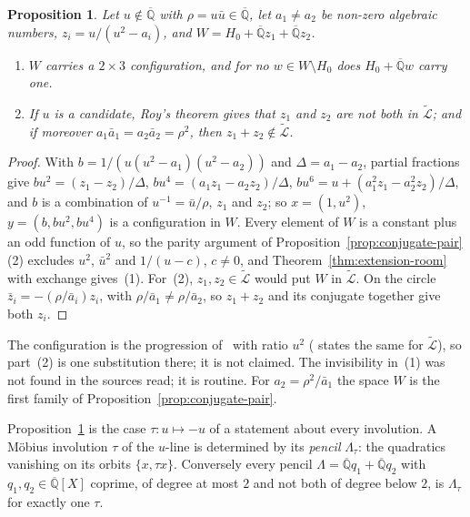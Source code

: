 \documentclass[11pt,a4paper]{article}
\theoremstyle{plain}
\newtheorem{proposition}[theorem]{Proposition}
\theoremstyle{definition}
\newcommand{\Alg}{\overline{\mathbb{Q}}}
\newcommand{\aLogs}{\widetilde{\mathcal{L}}}
\begin{document}
\begin{proposition}\label{prop:two-pole}
Let $u\notin\Alg$ with $\rho=u\bar u\in\Alg$, let $a_{1}\neq a_{2}$ be non-zero algebraic numbers, $z_{i}=u/(u^{2}-a_{i})$,
and $W=H_{0}+\Alg z_{1}+\Alg z_{2}$.
\begin{enumerate}[label=\textup{(\arabic*)}]
\item $W$ carries a $2\times3$ configuration, and for no $w\in W\setminus H_{0}$ does $H_{0}+\Alg w$ carry one.
\item If $u$ is a candidate, Roy's theorem gives that $z_{1}$ and $z_{2}$ are not both in $\aLogs$; and if moreover
$a_{1}\bar a_{1}=a_{2}\bar a_{2}=\rho^{2}$, then $z_{1}+z_{2}\notin\aLogs$.
\end{enumerate}
\end{proposition}

\begin{proof}
With $b=1/(u(u^{2}-a_{1})(u^{2}-a_{2}))$ and $\Delta=a_{1}-a_{2}$, partial fractions give $bu^{2}=(z_{1}-z_{2})/\Delta$,
$bu^{4}=(a_{1}z_{1}-a_{2}z_{2})/\Delta$, $bu^{6}=u+(a_{1}^{2}z_{1}-a_{2}^{2}z_{2})/\Delta$, and $b$ is a combination of
$u^{-1}=\bar u/\rho$, $z_{1}$ and $z_{2}$; so $x=(1,u^{2})$, $y=(b,bu^{2},bu^{4})$ is a configuration in $W$. Every
element of $W$ is a constant plus an odd function of $u$, so the parity argument of
Proposition~\ref{prop:conjugate-pair}(2) excludes $u^{2}$, $\bar u^{2}$ and $1/(u-c)$, $c\neq0$, and
Theorem~\ref{thm:extension-room} with exchange gives~(1). For~(2), $z_{1},z_{2}\in\aLogs$ would put $W$ in $\aLogs$. On
the circle $\bar z_{i}=-(\rho/\bar a_{i})z_{i}$, with $\rho/\bar a_{1}\neq\rho/\bar a_{2}$, so $z_{1}+z_{2}$ and its
conjugate together give both $z_{i}$.
\end{proof}

The configuration is the progression of~\cite[Th\'eor\`eme~7(2)]{diaz-2007} with ratio $u^{2}$
(\cite[Lemma~6.1]{fischler-2001} states the same for $\aLogs$), so part~(2) is one substitution there; it
is not claimed. The invisibility in~(1) was not found in the
sources read; it is routine. For $a_{2}=\rho^{2}/\bar a_{1}$ the space $W$ is the first family of
Proposition~\ref{prop:conjugate-pair}.

Proposition~\ref{prop:two-pole} is the case $\tau\colon u\mapsto-u$ of a statement about every involution. A Möbius
involution $\tau$ of the $u$-line is determined by its \emph{pencil} $\Lambda_{\tau}$: the quadratics vanishing on
its orbits $\{x,\tau x\}$. Conversely every pencil $\Lambda=\Alg q_{1}+\Alg q_{2}$ with $q_{1},q_{2}\in\Alg[X]$ coprime,
of degree at most $2$ and not both of degree below $2$, is $\Lambda_{\tau}$ for exactly one $\tau$.
\end{document}
